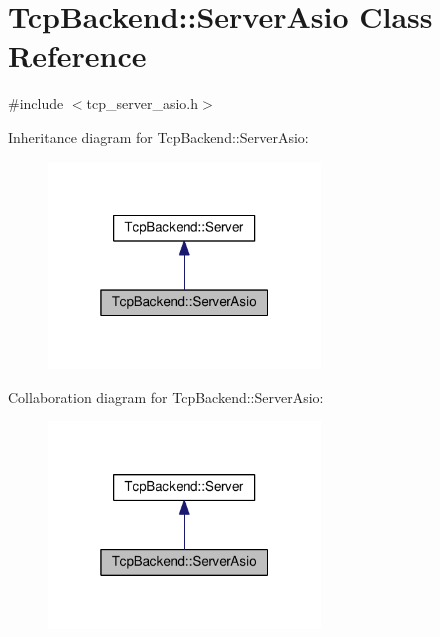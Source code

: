\hypertarget{classTcpBackend_1_1ServerAsio}{}\section{Tcp\+Backend\+:\+:Server\+Asio Class Reference}
\label{classTcpBackend_1_1ServerAsio}


{\ttfamily \#include $<$tcp\+\_\+server\+\_\+asio.\+h$>$}



Inheritance diagram for Tcp\+Backend\+:\+:Server\+Asio\+:
\nopagebreak
\begin{figure}[H]
\begin{center}
\leavevmode
\includegraphics[width=205pt]{classTcpBackend_1_1ServerAsio__inherit__graph}
\end{center}
\end{figure}


Collaboration diagram for Tcp\+Backend\+:\+:Server\+Asio\+:
\nopagebreak
\begin{figure}[H]
\begin{center}
\leavevmode
\includegraphics[width=205pt]{classTcpBackend_1_1ServerAsio__coll__graph}
\end{center}
\end{figure}
